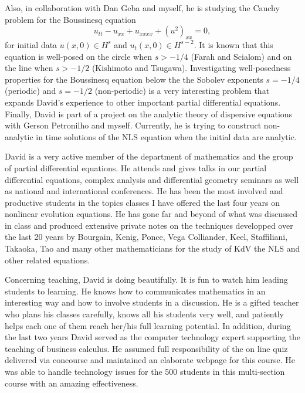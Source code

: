 %

Also, in collaboration with Dan Geba and myself,
he is studying the Cauchy  problem for 
 the Boussinesq equation
\begin{equation}
\label{buss}
   u_{tt} - u_{xx} + u_{xxxx} + (u^{2})_{xx} = 0,
   \end{equation}
  for initial data $u(x,0) \in H^{s}$ and  $u_{t}(x,0)\in H^{s-2}$.
  It is known that this equation is well-posed on the circle
when $s>-1/4$ (Farah and Scialom) and on the line 
when  $s>-1/2$  (Kishimoto and Tsugawa).
Investigating  well-posedness properties for
the Boussinesq equation below the  
the Sobolev exponents 
$s=-1/4$ (periodic) and  $s=-1/2$ (non-periodic) 
is a very interesting problem
that expands David's experience 
to other important partial differential equations. 
Finally,  David is part of a project on the  analytic theory
of dispersive equations with  Gerson Petronilho and myself.
Currently, he is trying to construct non-analytic in time solutions of the 
NLS equation when the initial data are analytic. 


David is a very active member of the department of mathematics
 and the  group of partial differential equations.
 He attends and gives talks in our partial differential equations, 
complex analysis and differential  geometry seminars as well as 
national and international conferences.
He has been the most involved and productive students 
in the topics classes I have offered the last four years
on nonlinear evolution equations.
He has gone far and beyond of what was discussed 
in class and produced extensive private notes 
on the techniques  developped over the last 20 years by Bourgain, 
 Kenig, Ponce, Vega Colliander, Keel, Staffiliani, Takaoka, Tao and many other mathematicians for the study of KdV the NLS and other related equations.



 

Concerning teaching,  David  is doing beautifully.
It is fun to watch him  leading students to learning.
He knows how to communicates mathematics in an interesting
 way and how to involve students in a discussion. 
He is a gifted teacher who plans his classes carefully,
knows all his students very well,  and patiently helps
each one of them reach her/his full learning potential.
In addition,  during  the last two years David served
as the  computer technology expert supporting
the teaching of business calculus.
He assumed full  responsibility of the on line quiz 
delivered via concourse and maintained 
an elaborate webpage for this course.
He was able to handle technology  issues for 
the  500 students in this multi-section course 
with an amazing effectiveness. 




